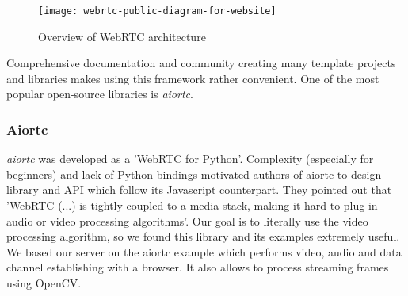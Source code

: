 \documentclass[../Main.tex]{subfiles}
\begin{document}
    \begin{figure}[h]
    \centering
    \texttt{[image: webrtc-public-diagram-for-website]}
    \caption{Overview of WebRTC architecture}
    \label{fig:webrtc-public-diagram-for-website}
    \end{figure}

    Comprehensive documentation and community creating many template projects and libraries makes using this framework rather convenient. One of the most popular open-source libraries is \textit{aiortc}.
    
    \subsubsection{Aiortc}
    \textit{aiortc} was developed as a 'WebRTC for Python'. Complexity (especially for beginners) and lack of Python bindings motivated authors of aiortc to design library and API which follow its Javascript counterpart. They pointed out that  'WebRTC (...) is tightly coupled to a media stack, making it hard to plug in audio or video processing algorithms'. Our goal is to literally use the video processing algorithm, so we found this library and its examples extremely useful.
    We based our server on the aiortc example which performs video, audio and data channel establishing with a browser. It also allows to process streaming frames using OpenCV. 
    
\end{document}
